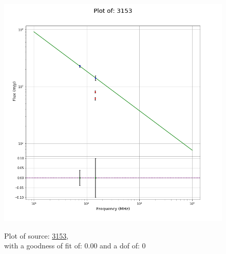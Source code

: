 \documentclass{article}
\begin{document}
\begin{figure}[H]
    \centering
    \begin{minipage}{.5\textwidth}
        \centering
        \includegraphics[scale = 0.35]{KmeulenSimSource_1hr/1hr3153.png}
        \captionsetup{labelformat=empty}
        \caption{Plot of source: \href{http://banana.transientskp.org/r4/vlo_KmeulenSimSource/runningcatalog/3153}{3153},\\with a goodness of fit of: 0.00 and a dof of: 0}
        \addtocounter{figure}{-1}
        \label{KmeulenSimSource:1hr:3153:plot}
    \end{minipage}%
    \begin{minipage}{0.5\textwidth}
        \centering


\end{minipage}
\end{figure}
\end{document}
